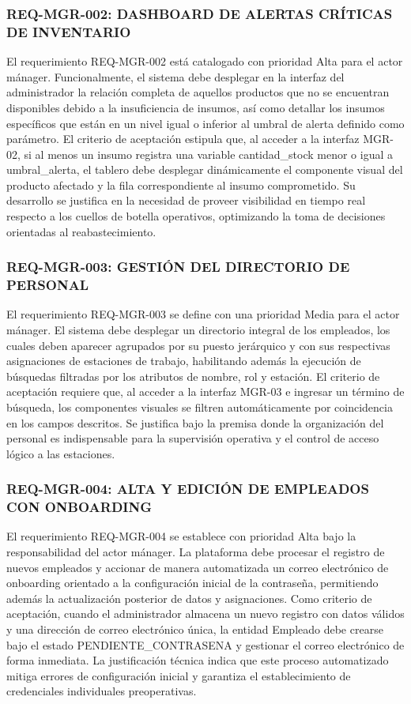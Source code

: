 \subsubsection{REQ-MGR-002: DASHBOARD DE ALERTAS CRÍTICAS DE INVENTARIO}
El requerimiento REQ-MGR-002 está catalogado con prioridad Alta para el actor mánager. Funcionalmente, el sistema debe desplegar en la interfaz del administrador la relación completa de aquellos productos que no se encuentran disponibles debido a la insuficiencia de insumos, así como detallar los insumos específicos que están en un nivel igual o inferior al umbral de alerta definido como parámetro. El criterio de aceptación estipula que, al acceder a la interfaz MGR-02, si al menos un insumo registra una variable cantidad\_stock menor o igual a umbral\_alerta, el tablero debe desplegar dinámicamente el componente visual del producto afectado y la fila correspondiente al insumo comprometido. Su desarrollo se justifica en la necesidad de proveer visibilidad en tiempo real respecto a los cuellos de botella operativos, optimizando la toma de decisiones orientadas al reabastecimiento. 

\subsubsection{REQ-MGR-003: GESTIÓN DEL DIRECTORIO DE PERSONAL}
El requerimiento REQ-MGR-003 se define con una prioridad Media para el actor mánager. El sistema debe desplegar un directorio integral de los empleados, los cuales deben aparecer agrupados por su puesto jerárquico y con sus respectivas asignaciones de estaciones de trabajo, habilitando además la ejecución de búsquedas filtradas por los atributos de nombre, rol y estación. El criterio de aceptación requiere que, al acceder a la interfaz MGR-03 e ingresar un término de búsqueda, los componentes visuales se filtren automáticamente por coincidencia en los campos descritos. Se justifica bajo la premisa donde la organización del personal es indispensable para la supervisión operativa y el control de acceso lógico a las estaciones. 

\subsubsection{REQ-MGR-004: ALTA Y EDICIÓN DE EMPLEADOS CON ONBOARDING}
El requerimiento REQ-MGR-004 se establece con prioridad Alta bajo la responsabilidad del actor mánager. La plataforma debe procesar el registro de nuevos empleados y accionar de manera automatizada un correo electrónico de onboarding orientado a la configuración inicial de la contraseña, permitiendo además la actualización posterior de datos y asignaciones. Como criterio de aceptación, cuando el administrador almacena un nuevo registro con datos válidos y una dirección de correo electrónico única, la entidad Empleado debe crearse bajo el estado PENDIENTE\_CONTRASENA y gestionar el correo electrónico de forma inmediata. La justificación técnica indica que este proceso automatizado mitiga errores de configuración inicial y garantiza el establecimiento de credenciales individuales preoperativas.

